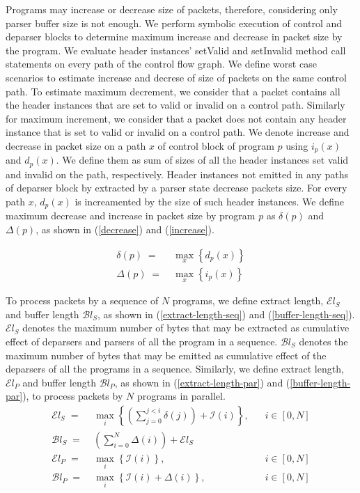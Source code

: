 Programs may increase or decrease size of packets, therefore, considering only parser buffer size is not enough.
We perform symbolic execution of control and deparser blocks to determine maximum increase and decrease in packet size by the program.
We evaluate header instances' setValid and setInvalid method call statements on every path of the control flow graph.
We define worst case scenarios to estimate increase and decrese of size of packets on the same control path.
To estimate maximum decrement, we consider that a packet contains all the header instances that are set to valid or invalid on a control path.
Similarly for maximum increment, we consider that a packet does not contain any header instance that is set to valid or invalid on a control path. 
We denote increase and decrease in packet size on a path $x$ of control block of program $p$ using $i_{p}(x)$ and $d_{p}(x)$.
We define them as sum of sizes of all the header instances set valid and invalid on the path, respectively.
Header instances not emitted in any paths of deparser block by extracted by a parser state decrease packets size. 
For every path $x$, $d_{p}(x)$ is increamented by the size of such header instances. 
We define maximum decrease and increase in packet size by program $p$ as $\delta(p)$ and $\Delta(p)$, as shown in (\ref{decrease}) and (\ref{increase}).


\begin{align}
\delta(p)\; =& \;  \max_{x} \left\{ d_{p}(x) \right\} \label{decrease} \\
\Delta(p) \; =& \; \max_{x} \left\{ i_{p}(x) \right\} \label{increase}
\end{align}

To process packets by a sequence of $N$ programs, we define extract length, $\mathcal{E}l_{S}$ and buffer length $\mathcal{B}l_{S}$, as shown in (\ref{extract-length-seq}) and (\ref{buffer-length-seq}).
$\mathcal{E}l_{S}$ denotes the maximum number of bytes that may be extracted as cumulative effect of deparsers and parsers of all the program in a sequence.
$\mathcal{B}l_{S}$ denotes the maximum number of bytes that may be emitted as cumulative effect of the deparsers of all the programs in a sequence.
Similarly, we define extract length, $\mathcal{E}l_{P}$ and buffer length $\mathcal{B}l_{P}$, as shown in (\ref{extract-length-par}) and (\ref{buffer-length-par}), to process packets by $N$ programs in parallel.
\begin{align}
\mathcal{E}l_{S} \; =& \; \max_{i} \left\{ \left( \sum_{j=0}^{j<i} \delta(j) \right)+ \mathcal{I}(i) \right\},&\;\;\;i  \in [0,N] \label{extract-length-seq} \\
\mathcal{B}l_{S} \; =& \; \left( \sum_{i=0}^{N} \Delta(i) \right)+ \mathcal{E}l_{S} & \label{buffer-length-seq} \\
\mathcal{E}l_{P} \; =& \; \max_{i} \left\{ \mathcal{I}(i) \right\},&\;\;\;i  \in [0,N] \label{extract-length-par} \\
\mathcal{B}l_{P} \; =& \; \max_{i} \left\{ \mathcal{I}(i) + \Delta(i) \right\},&\;\;\;i  \in [0,N]  \label{buffer-length-par}
\end{align}


